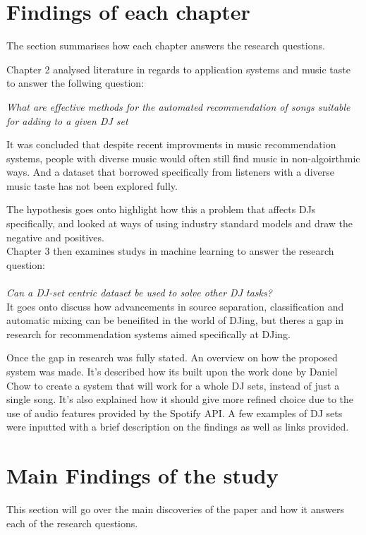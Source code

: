 \section{Findings of each chapter}
The section summarises how each chapter answers the research questions.

Chapter 2 analysed literature in regards to application systems and music taste to answer the follwing question: 

\textit{What are effective methods for the automated recommendation of songs suitable
	for adding to a given DJ set}

It was concluded that despite recent improvments in music recommendation systems, people with diverse music would often still find music in non-algoirthmic ways. And a dataset that borrowed specifically from listeners with a diverse music taste has not been explored fully.

The hypothesis goes onto highlight how this a problem that affects DJs specifically, and looked at ways of using industry standard models and draw the negative and positives.
\\

Chapter 3 then examines studys in machine learning to answer the research question:
\\
\\
\textit{Can a DJ-set centric dataset be used to solve other DJ tasks?}
\\

It goes onto discuss how advancements in source separation, classification and automatic mixing can be beneifited in the world of DJing, but theres a gap in research for recommendation systems aimed specifically at DJing.

Once the gap in research was fully stated. An overview on how the proposed system was made. It's described how its built upon the work done by Daniel Chow to create a system that will work for a whole DJ sets, instead of just a single song. It's also explained how it should give more refined choice due to the use of audio features provided by the Spotify API. A few examples of DJ sets were inputted with a brief description on the findings as well as links provided.

\section{Main Findings of the study}

This section will go over the main discoveries of the paper and how it answers each of the research questions.

